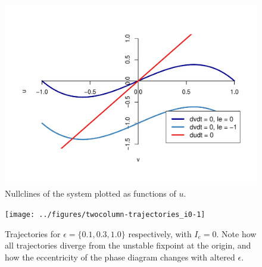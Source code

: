 \documentclass[10pt]{article}\usepackage[]{graphicx}\usepackage[]{color}
\makeatletter
\def\maxwidth{ %
  \ifdim\Gin@nat@width>\linewidth
    \linewidth
  \else
    \Gin@nat@width
  \fi
}
\theoremstyle{plain}
\makeatother
\begin{document}
\begin{multicols*}{2}
\begin{Schunk}
\begin{figure}[H]
{\centering \includegraphics[width=\maxwidth]{../figures/twocolumn-nullclines-1} 

}

\caption[Nullclines of the system plotted as functions of $u$]{Nullclines of the system plotted as functions of $u$.}\label{fig:nullclines}
\end{figure}
\end{Schunk}
	
	
\begin{Schunk}
\begin{figure}[H]

{\centering \texttt{[image: ../figures/twocolumn-trajectories\_i0-1]} 

}

\caption{Trajectories for $\epsilon = \{0.1, 0.3, 1.0\}$ respectively, with $I_e = 0$. Note how all trajectories diverge from the unstable fixpoint at the origin, and how the eccentricity of the phase diagram changes with altered $\epsilon$.}\label{fig:trajectories.i0}
\end{figure}
\end{Schunk}
	~
\begin{Schunk}
\begin{figure}[H]


\end{figure}
\end{Schunk}
\end{multicols*}
\end{document}
